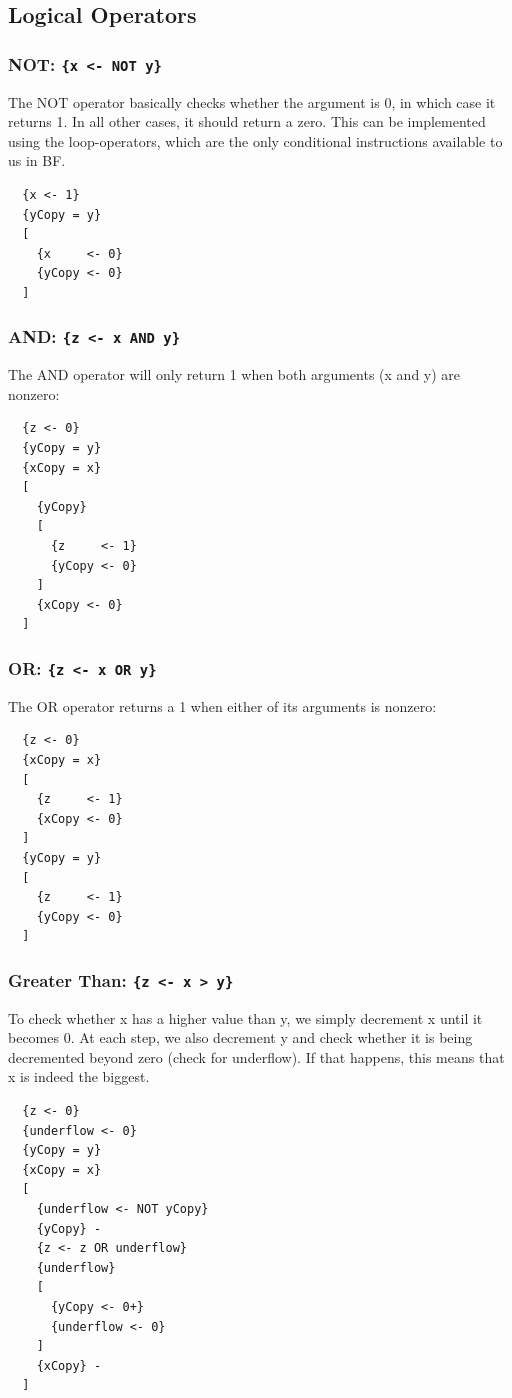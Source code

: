 \subsection{Logical Operators}
\subsubsection{NOT: \texttt{\{x <- NOT y\}}}
The NOT operator basically checks whether the argument is 0, in which case it returns 1. In all other cases, it should return a zero. This can be implemented using the loop-operators, which are the only conditional instructions available to us in BF.
\begin{lstlisting}
  {x <- 1}
  {yCopy = y}
  [
    {x     <- 0}
    {yCopy <- 0}
  ]
\end{lstlisting}

\subsubsection{AND: \texttt{\{z <- x AND y\}}}
The AND operator will only return 1 when both arguments (x and y) are nonzero:
\begin{lstlisting}
  {z <- 0}
  {yCopy = y}
  {xCopy = x}
  [
    {yCopy}
    [
      {z     <- 1}
      {yCopy <- 0}
    ]
    {xCopy <- 0}
  ]
\end{lstlisting}

\subsubsection{OR: \texttt{\{z <- x OR y\}}}
The OR operator returns a 1 when either of its arguments is nonzero:
\begin{lstlisting}
  {z <- 0}
  {xCopy = x}
  [
    {z     <- 1}
    {xCopy <- 0}
  ]
  {yCopy = y}
  [
    {z     <- 1}
    {yCopy <- 0}
  ]
\end{lstlisting}

\subsubsection{Greater Than: \texttt{\{z <- x > y\}}}
To check whether x has a higher value than y, we simply decrement x until it becomes 0. At each step, we also decrement y and check whether it is being decremented beyond zero (check for underflow). If that happens, this means that x is indeed the biggest.
\begin{lstlisting}
  {z <- 0}
  {underflow <- 0}
  {yCopy = y}
  {xCopy = x}
  [
    {underflow <- NOT yCopy}
    {yCopy} -
    {z <- z OR underflow}
    {underflow}
    [
      {yCopy <- 0+}
      {underflow <- 0}
    ]
    {xCopy} -
  ]
\end{lstlisting}

